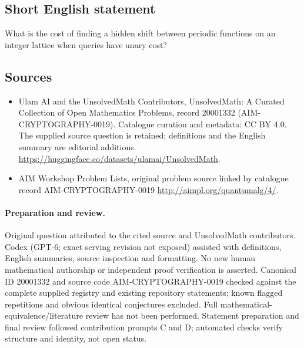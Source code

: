 \documentclass[11pt]{article}
\begin{document}
\subsection{Short English statement}
What is the cost of finding a hidden shift between periodic functions on an integer lattice when queries have unary cost?
\subsection{Sources}
\begin{itemize}
\item[\hypertarget{source:20001332:1}{S1}] Ulam AI and the UnsolvedMath Contributors, UnsolvedMath: A Curated Collection of Open Mathematics Problems, record 20001332 (AIM-CRYPTOGRAPHY-0019). Catalogue curation and metadata: CC BY 4.0. The supplied source question is retained; definitions and the English summary are editorial additions.
\url{https://huggingface.co/datasets/ulamai/UnsolvedMath}.
\item[\hypertarget{source:20001332:2}{S2}] AIM Workshop Problem Lists, original problem source linked by catalogue record AIM-CRYPTOGRAPHY-0019
\url{http://aimpl.org/quantumalg/4/}.
\end{itemize}
\paragraph{Preparation and review.}
Original question attributed to the cited source and UnsolvedMath contributors. Codex (GPT-6; exact serving revision not exposed) assisted with definitions, English summaries, source inspection and formatting. No new human mathematical authorship or independent proof verification is asserted. Canonical ID 20001332 and source code AIM-CRYPTOGRAPHY-0019 checked against the complete supplied registry and existing repository statements; known flagged repetitions and obvious identical conjectures excluded. Full mathematical-equivalence/literature review has not been performed. Statement preparation and final review followed contribution prompts C and D; automated checks verify structure and identity, not open status.
\label{end:20001332}
\end{document}
